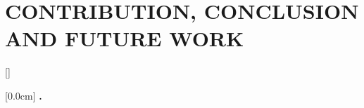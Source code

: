 \documentclass[a4paper,13pt,twoside]{extreport}
\renewcommand{\bibname}{reference}
\renewcommand{\figurename}{Figure}
\renewcommand{\tablename}{Table}
\renewcommand{\chaptername}{CHAPTER}
\theoremstyle{definition}
\begin{document}
\newpage
\pagestyle{fancy}
\chapter{CONTRIBUTION, CONCLUSION AND FUTURE WORK}
\label{chapter:Contribution_conclusion_and_future_work}
% 


\newpage
\renewcommand\bibname{REFERENCE}
\label{chapter:Reference}
\printbibliography
{}

\appendixpage
\appendices
\addappheadtotoc
\renewcommand{\figurename}{Figure}
\renewcommand{\tablename}{Table}
\renewcommand{\chaptername}{CHAPTER}


{}[]
\titlespacing*{\chapter}{0pt}{-20pt}{20pt}

[0.0cm]             %
{\bfseries\vspace{0.3cm}}                  %
{{\bfseries{\scshape} \thecontentslabel.\ }} %
{}         %
{\contentspage}         %
% 

% 

% 

% 

% 
\end{document}
